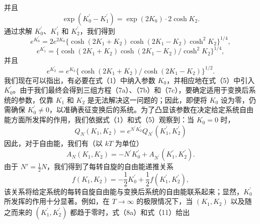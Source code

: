 并且
\begin{equation}\tag{14.2.9}\label{eq:14.2.9}
\exp ( K _ { 0 } ^{\prime} - K _ { 1 } ^{\prime} ) = \exp ( 2 K _ { 0 } ) \cdot 2 \cosh K _ { 2 } .
\end{equation}
通过求解 \(K_{0}^{\prime}\)、\(K_{1}^{\prime}\) 和 \(K_{2}^{\prime}\)，我们得到
\begin{equation}\tag{14.2.10}\label{eq:14.2.10}
e ^{K _ { 0} ^{\prime} } = 2 e ^{2 K _ { 0} } \{ \cosh ( 2 K _ { 1 } + K _ { 2 } ) \cosh ( 2 K _ { 1 } - K _ { 2 } ) \cosh ^{2} K _ { 2 } \} ^{1 / 4} ,
\end{equation}
\begin{equation}\tag{14.2.11}\label{eq:14.2.11}
e ^{K _ { 1} ^{\prime} } = \{ \cosh ( 2 K _ { 1 } + K _ { 2 } ) \cosh ( 2 K _ { 1 } - K _ { 2 } ) / \cosh ^{2} K _ { 2 } \} ^{1 / 4} ,
\end{equation}
并且
\begin{equation}\tag{14.2.12}\label{eq:14.2.12}
e ^{K _ { 2} ^{\prime} } = e ^{K _ { 2} } \{ \cosh ( 2 K _ { 1 } + K _ { 2 } ) / \cosh ( 2 K _ { 1 } - K _ { 2 } ) \} ^{1 / 2} .
\end{equation}
我们现在可以指出，有必要在式（1）中纳入参数 \(K_{0}\)，并相应地在式（5）中引入 \(K_{0}^{\prime}\)。由于我们最终会得到三组方程（7a）、（7b）和（7c），要确定适用于变换后系统的参数，仅靠 \(K_{1}\) 和 \(K_{2}\) 是无法解决这一问题的；因此，即便将 \(K_{0}\) 设为零，仍需确保 \(K_{0}^{\prime} \neq 0\)，以准确表征变换后的系统。为了凸显该参数在决定给定系统自由能方面所发挥的作用，我们依据式（1）和式（5）观察到：当 \(K_{0} = 0\) 时，
\begin{equation}\tag{14.2.13}\label{eq:14.2.13}
Q _ { N } ( K _ { 1 } , K _ { 2 } ) = e ^{N ^ { \prime} K _ { 0 } ^{\prime} } Q _ { N ^{\prime} } ( K _ { 1 } ^{\prime} , K _ { 2 } ^{\prime} )
\end{equation}
因此，对于自由能，我们有（以 \(kT\) 为单位）
\begin{equation}\tag{14.2.14}\label{eq:14.2.14}
A _ { N } ( K _ { 1 } , K _ { 2 } ) = - N ^{\prime} K _ { 0 } ^{\prime} + A _ { N ^{\prime} } ( K _ { 1 } ^{\prime} , K _ { 2 } ^{\prime} ) .
\end{equation}
由于 \(N' = \frac{1}{2}N\)，我们得到了每转自旋的自由能递推关系
\begin{equation}\tag{14.2.15}\label{eq:14.2.15}
f ( K _ { 1 } , K _ { 2 } ) = - \frac { 1 } { 2 } K _ { 0 } ^{\prime} + \frac { 1 } { 2 } f ( K _ { 1 } ^{\prime} , K _ { 2 } ^{\prime} ) ,
\end{equation}
该关系将给定系统的每转自旋自由能与变换后系统的自由能联系起来；显然，\(K_{0}^{\prime}\) 所发挥的作用十分显著。例如，在 \(T \rightarrow \infty\) 的极限情况下，当 \((K_{1}, K_{2})\) 以及随之而来的 \((K_{1}^{\prime}, K_{2}^{\prime})\) 都趋于零时，式（8a）和式（11）给出
